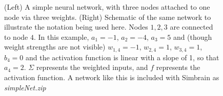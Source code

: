 \begin{figure}[h]
\centering
{}
\hspace*{.4in}
\caption[Left: Simbrain screenshot; Right: Jeff Yoshimi.]{(Left) A simple neural network, with three nodes attached to one node via three weights. (Right) Schematic of the same network to illustrate the notation being used here. Nodes $1,2, 3$ are connected to node $4$. In this example, $a_1 = -1$, $a_2 = -4$, $a_3=5$ and (though weight strengths are not visible) $w_{1,4} = -1$, $w_{2,4} = 1$, $w_{3,4} = 1$, $b_4 = 0$ and the activation function is linear with a slope of 1, so that $a_4 = 2$. $\Sigma$ represents the weighted inputs, and $f$ represents the activation function. A network like this is included with Simbrain as \emph{simpleNet.zip}}
\label{F:simplenet1}
\end{figure}

